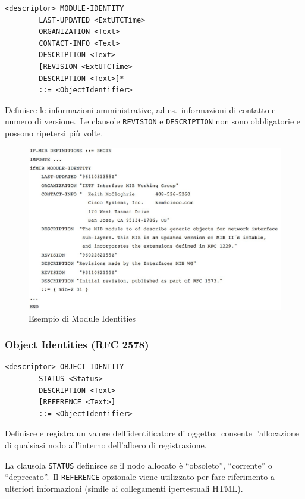 \begin{verbatim}
<descriptor> MODULE-IDENTITY
        LAST-UPDATED <ExtUTCTime>
        ORGANIZATION <Text>
        CONTACT-INFO <Text>
        DESCRIPTION <Text>
        [REVISION <ExtUTCTime>
        DESCRIPTION <Text>]*
        ::= <ObjectIdentifier>
\end{verbatim}
Definisce le informazioni amministrative, ad es.\ informazioni di contatto e numero di versione.\
Le clausole \texttt{REVISION} e \texttt{DESCRIPTION} non sono obbligatorie e possono ripetersi più volte.

\begin{figure}[H]
    \centering
    \includegraphics[width=\textwidth]{immagini/Module_Identities.jpg}
    \caption*{Esempio di Module Identities}
\end{figure}

\subsubsection{Object Identities (RFC 2578)}

\begin{verbatim}
<descriptor> OBJECT-IDENTITY
        STATUS <Status>
        DESCRIPTION <Text>
        [REFERENCE <Text>]
        ::= <ObjectIdentifier>

\end{verbatim}
Definisce e registra un valore dell'identificatore di oggetto:\ consente l'allocazione di qualsiasi nodo all'interno dell'albero di registrazione.\

La clausola \texttt{STATUS} definisce se il nodo allocato è ``obsoleto'', ``corrente'' o ``deprecato''.\
Il \texttt{REFERENCE} opzionale viene utilizzato per fare riferimento a ulteriori informazioni (simile ai collegamenti ipertestuali HTML).

